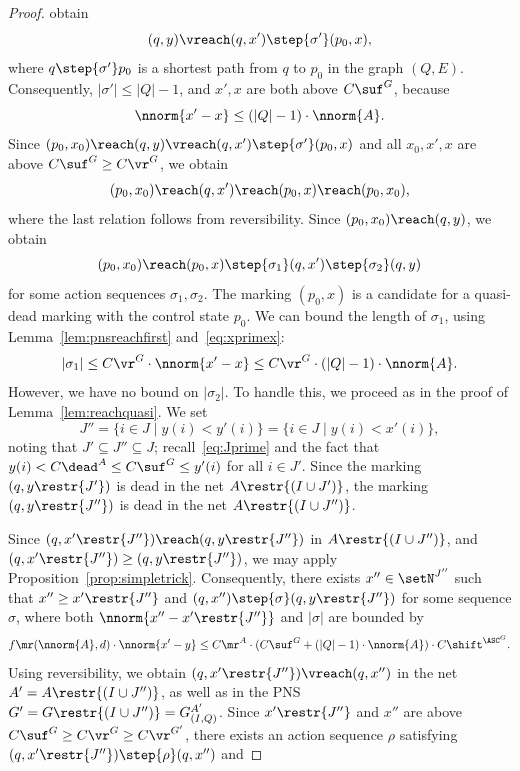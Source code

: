 \begin{proof}
	obtain
 \[(q,y)\vreach (q,x')\step{\sigma'}(p_0,x),\]
where
$q\step{\sigma'}p_0$ is a shortest path from $q$ to $p_0$ in the graph
$(Q,E)$. Consequently, $|\sigma'|\leq |Q|-1$, and $x',x$ are both above
$C\suf^G$, because
\begin{equation}\label{eq:xprimex}
	\nnorm{x'-x}\leq (|Q|-1)\cdot\nnorm{A}.
\end{equation}
Since $(p_0,x_0)\reach(q,y)\vreach(q,x')\step{\sigma'}(p_0,x)$
and all $x_0,x',x$ are above $C\suf^G\geq C\vr^G$,
 we obtain
\begin{equation*}
(p_0,x_0)\reach(q,x')\reach(p_0,x)\reach(p_0,x_0),
\end{equation*}
where the last relation follows from reversibility.
Since $(p_0,x_0)\reach(q,y)$, we obtain
\[(p_0,x_0)\reach(p_0,x)\step{\sigma_1}(q,x')\step{\sigma_2}(q,y)\]
for some action sequences
$\sigma_1,\sigma_2$.
The marking $(p_0,x)$ is a candidate for a quasi-dead marking with
the control state $p_0$.
We can bound the length of $\sigma_1$, using
Lemma~\ref{lem:pnsreachfirst} and~\eqref{eq:xprimex}: 
\begin{equation}\label{eq:sigmaone}
	|\sigma_1|\leq C\vr^G\cdot \nnorm{x'-x}\leq
C\vr^G\cdot(|Q|-1)\cdot\nnorm{A}.
\end{equation}
However, we have no bound on $|\sigma_2|$. To handle this, we proceed
as in the proof of Lemma~\ref{lem:reachquasi}.
We set 
\begin{equation}\label{eq:Jprimeprime}
	J''=\{i\in J\mid y(i)< y'(i)\}=\{i\in J\mid y(i)<x'(i)\},
\end{equation}
	noting that $J'\subseteq J''\subseteq J$; recall~\eqref{eq:Jprime} and
	the fact that 
		 $y(i)<C\dead^A\leq C\suf^G\leq y'(i)$ for
	all $i\in J'$.
Since the marking  $(q,y\restr{J'})$ is dead in the net  $A\restr{(I\cup
J')}$, the marking
$(q,y\restr{J''})$ is dead in the net $A\restr{(I\cup J'')}$.

Since $(q,x'\restr{J''})\reach(q,y\restr{J''})$ in  
 $A\restr{(I\cup J'')}$, and  $(q,x'\restr{J''})\geq
 (q,y\restr{J''})$,
 we may apply
 Proposition~\ref{prop:simpletrick}. Consequently, there exists 
 $x''\in \setN^{J''}$ such that
 $x''\geq x'\restr{J''}$ 
and $(q,x'')\step{\sigma}(q,y\restr{J''})$ for some sequence $\sigma$,
where both $\nnorm{x''-x'\restr{J''}}$ and $|\sigma|$ are bounded by
\begin{equation}\label{eq:boundfmr} 
f\mr(\nnorm{A},d)\cdot \nnorm{x'-y}\leq C\mr^A\cdot
	(C\suf^G+(|Q|-1)\cdot\nnorm{A})\cdot C\shift^{\ASC^G}.
\end{equation}
Using reversibility, we obtain $(q,x'\restr{J''})\vreach (q,x'')$
in the net $A'=A\restr{(I\cup J'')}$, as well as in the PNS
$G'=G\restr{(I\cup J'')}=G^{A'}_{(I,Q)}$. Since $x'\restr{J''}$ and
$x''$ are above $C\suf^G\geq C\vr^G\geq C\vr^{G'}$, there exists an
action sequence $\rho$ satisfying
$(q,x'\restr{J''})\step{\rho}(q,x'')$ and 


\end{proof}
